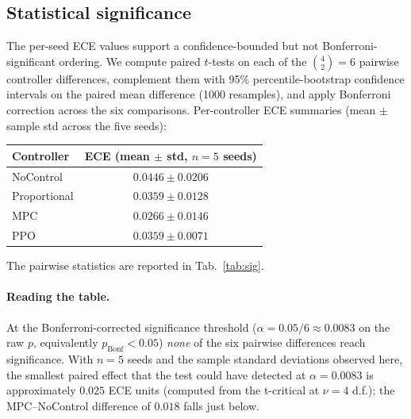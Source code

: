 \documentclass[11pt,letterpaper]{article}
\begin{document}
\subsection{Statistical significance}
\label{sec:significance}

The per-seed ECE values support a confidence-bounded but not
Bonferroni-significant ordering. We compute paired $t$-tests on each of
the $\binom{4}{2} = 6$ pairwise controller differences, complement them
with 95\% percentile-bootstrap confidence intervals on the paired
mean difference (1000 resamples), and apply Bonferroni correction
across the six comparisons. Per-controller ECE summaries (mean $\pm$
sample std across the five seeds):

\begin{center}
\begin{tabular}{lc}
\toprule
Controller & ECE (mean $\pm$ std, $n=5$ seeds) \\
\midrule
NoControl    & $0.0446 \pm 0.0206$ \\
Proportional & $0.0359 \pm 0.0128$ \\
MPC          & $\mathbf{0.0266 \pm 0.0146}$ \\
PPO          & $0.0359 \pm 0.0071$ \\
\bottomrule
\end{tabular}
\end{center}

The pairwise statistics are reported in Tab.~\ref{tab:sig}.

\begin{table}[H]
\centering
\caption{Pairwise per-seed ECE comparisons. Mean difference $A - B$ in
the third column; 95\% paired bootstrap CI in the fourth; Bonferroni-corrected
$p$-value (paired two-sided $t$, $\times 6$) in the fifth.}
\label{tab:sig}
\small

\end{table}

\paragraph{Reading the table.}
At the Bonferroni-corrected significance threshold ($\alpha = 0.05/6 \approx 0.0083$
on the raw $p$, equivalently $p_\mathrm{Bonf} < 0.05$) \emph{none} of the
six pairwise differences reach significance. With $n = 5$ seeds and the
sample standard deviations observed here, the smallest paired effect that
the test could have detected at $\alpha = 0.0083$ is approximately
$0.025$ ECE units (computed from the t-critical at $\nu = 4$ d.f.);
the MPC--NoControl difference of $0.018$ falls just below.
\end{document}
